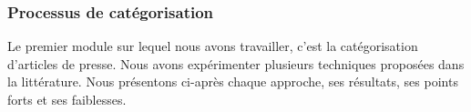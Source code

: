 \subsubsection{Processus de catégorisation}

 Le premier module sur lequel nous avons travailler, c'est la catégorisation d'articles de presse. Nous avons expérimenter plusieurs techniques proposées dans la littérature. Nous présentons ci-après chaque approche, ses résultats, ses points forts et ses faiblesses.


